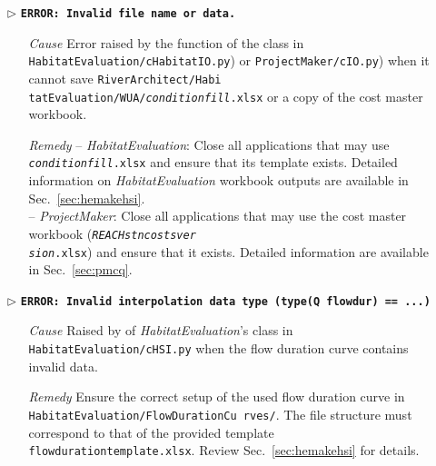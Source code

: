 \begin{itemize}
	\item[$\triangleright$]\textbf{\texttt{ERROR: Invalid file name or data.}}
	\begin{itemize}
		\item[\textit{Cause}\hspace{0.27cm}] Error raised by the  function of the  class in \texttt{HabitatEvaluation/cHabitatIO.py}) or \texttt{ProjectMaker/cIO.py}) when it cannot save \texttt{RiverArchitect/Habi tatEvaluation/WUA/\textit{condition}{\myUnderscore}\textit{fill}.xlsx} or a copy of the cost master workbook.
		\item[\textit{Remedy}] -- \textit{HabitatEvaluation}: Close all applications that may use \texttt{\textit{condition}{\myUnderscore}\textit{fill}.xlsx} and ensure that its template exists. Detailed information on \textit{HabitatEvaluation} workbook outputs are available in Sec.~\ref{sec:hemakehsi}.\\
		-- \textit{ProjectMaker}:  Close all applications that may use the cost master workbook (\texttt{\emph{REACH}{\myUnderscore}\emph{stn}{\myUnderscore}\emph{costs}{\myUnderscore}\emph{ver}\\\emph{sion}.xlsx}) and ensure that it exists. Detailed information are available in Sec.~\ref{sec:pmcq}.\\
	\end{itemize}
	
	\item[$\triangleright$]\textbf{\texttt{ERROR: Invalid interpolation data type (type(Q flowdur) ==  ...)}}
	\begin{itemize}
		\item[\textit{Cause}\hspace{0.27cm}] Raised by  of \textit{HabitatEvaluation}'s  class in \texttt{HabitatEvaluation/cHSI.py} when the flow duration curve contains invalid data.
		\item[\textit{Remedy}] Ensure the correct setup of the used flow duration curve in \texttt{HabitatEvaluation/FlowDurationCu rves/}. The file structure must correspond to that of the provided template \texttt{flow{\myUnderscore}duration{\myUnderscore}template.xlsx}. Review Sec.~\ref{sec:hemakehsi} for details.\\
	\end{itemize}
	

\end{itemize}

